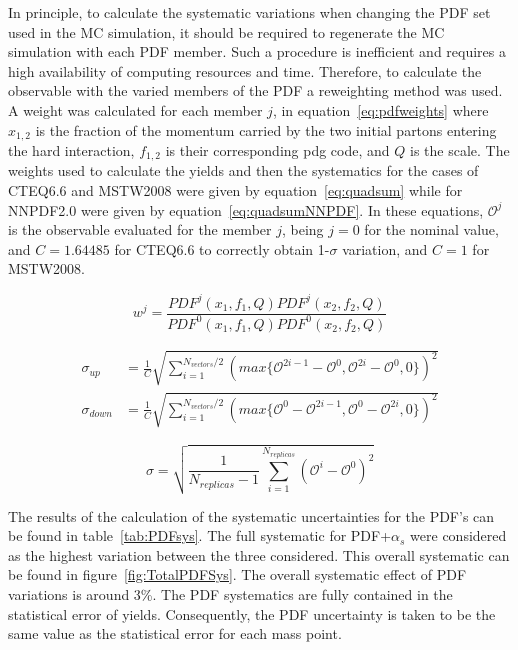 In principle, to calculate the systematic variations when changing the PDF set used in the MC simulation, it should be required to regenerate the MC simulation with each PDF member. Such a procedure is inefficient and requires a high availability of computing resources and time. Therefore, to calculate the observable with the varied members of the PDF a reweighting method was used. A weight was calculated for each member $j$, in equation~\ref{eq:pdfweights} where $x_{1,2}$ is the fraction of the momentum carried by the two initial partons entering the hard interaction, $f_{1,2}$ is their corresponding pdg code, and $Q$ is the scale. The weights used to calculate the yields and then the systematics for the cases of CTEQ6.6 and MSTW2008 were given by equation~\ref{eq:quadsum} while for NNPDF2.0 were given by equation~\ref{eq:quadsumNNPDF}. In these equations, $\mathcal{O}^{j}$ is the observable evaluated for the member $j$, being $j=0$ for the nominal value, and $C=1.64485$ for CTEQ6.6 to correctly obtain 1-$\sigma$ variation, and $C=1$ for MSTW2008.

\begin{equation} \label{eq:pdfweights}
w^{j}=\frac{PDF^{j}(x_{1},f_{1},Q)PDF^{j}(x_{2},f_{2},Q)}{PDF^{0}(x_{1},f_{1},Q)PDF^{0}(x_{2},f_{2},Q)}
\end{equation}

\begin{align} \label{eq:quadsum}
\sigma_{up} & = \frac{1}{C}\sqrt{\sum_{i=1}^{N_{vectors}/2}(max\{\mathcal{O}^{2i-1}-\mathcal{O}^{0},\mathcal{O}^{2i}-\mathcal{O}^{0},0\})^{2}} \nonumber\\
\sigma_{down} & = \frac{1}{C}\sqrt{\sum_{i=1}^{N_{vectors}/2}(max\{\mathcal{O}^{0}-\mathcal{O}^{2i-1},\mathcal{O}^{0}-\mathcal{O}^{2i},0\})^{2}}
\end{align}

\begin{equation} \label{eq:quadsumNNPDF}
\sigma = \sqrt{\frac{1}{N_{replicas}-1}\sum_{i=1}^{N_{replicas}}(\mathcal{O}^{i}-\mathcal{O}^{0})^{2}} 
\end{equation}

The results of the calculation of the systematic uncertainties for the PDF's can be found in table~\ref{tab:PDFsys}. The full systematic for PDF+$\alpha_{s}$ were considered as the highest variation between the three considered. This overall systematic can be found in figure~\ref{fig:TotalPDFSys}. The overall systematic effect of PDF variations is around 3\%. The PDF systematics are fully contained in the statistical error of yields. Consequently, the PDF uncertainty is taken to be the same value as the statistical error for each mass point.

